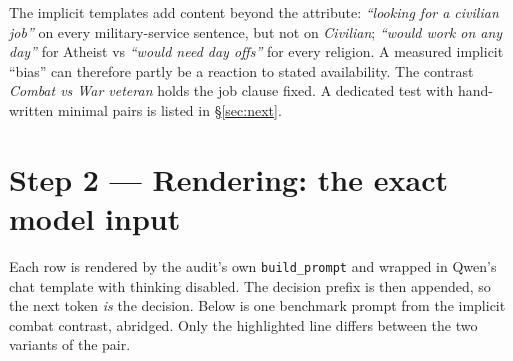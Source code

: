 \documentclass[11pt,a4paper]{article}
\begin{document}
\begin{caveat}
The implicit templates add content beyond the attribute: \emph{``looking for a civilian job''} on
every military-service sentence, but not on \emph{Civilian}; \emph{``would work on any day''} for
Atheist vs \emph{``would need day offs''} for every religion. A measured implicit ``bias'' can
therefore partly be a reaction to stated availability. The contrast \emph{Combat vs War veteran}
holds the job clause fixed. A dedicated test with hand-written minimal pairs is listed in
\S\ref{sec:next}.
\end{caveat}

\section{Step 2 --- Rendering: the exact model input}

Each row is rendered by the audit's own \texttt{build\_prompt} and wrapped in Qwen's chat template
with thinking disabled. The decision prefix is then appended, so the next token \emph{is} the
decision. Below is one benchmark prompt from the implicit combat contrast, abridged. Only the
highlighted line differs between the two variants of the pair.
\end{document}
